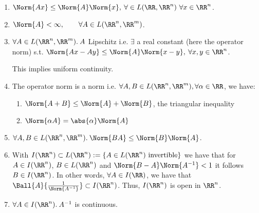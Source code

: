 \begin{thm}
 \begin{enumerate}
  \item $\Norm{Ax}\leq\Norm{A}\Norm{x}, \:\forall\in L(\RR, \RR^n)\ \forall x\in\RR^n$.
  \item $\Norm{A}<\infty,\qquad\forall A\in L(\RR^n,\RR^m)$.
  \item $\forall A\in L(\RR^n, \RR^m).\:A$ Lipschitz i.e. $\exists$ a real constant (here the operator norm) s.t. $\Norm{Ax-Ay}\leq\Norm{A}\Norm{x-y}, \:\forall x,y\in\RR^n$.
  \begin{exc}
   This implies uniform continuity.
  \end{exc}
  \item The operator norm is a norm i.e. $\forall A, B\in L(\RR^n,\RR^m), \forall \alpha\in\RR$, we have:
  \begin{enumerate}
   \item $\Norm{A+B}\leq \Norm{A}+\Norm{B}$, the triangular inequality
   \item $\Norm{\alpha A}=\abs{\alpha}\Norm{A}$
  \end{enumerate}
  \item $\forall A, B\in L(\RR^n, \RR^m).\:\Norm{BA}\leq \Norm{B}\Norm{A}$.
  \item With $I(\RR^n)\subset L(\RR^n):=\{A\in L(\RR^n)\text{ invertible}\}$ we have that for $A\in I(\RR^n)$, $B\in L(\RR^n)$ and $\Norm{B-A}\Norm{A^{-1}}<1$ it follows $B\in I(\RR^n)$. 
  In other words, $\forall A\in I(\RR)$, we have that $\Ball{A}{\frac{1}{\Norm{A^{-1}}}}\subset I(\RR^n)$. Thus, $I(\RR^n)$ is open in $\RR^n$.
  \item $\forall A\in I(\RR^n).\:A^{-1}$ is continuous. 
 \end{enumerate}
\end{thm}
